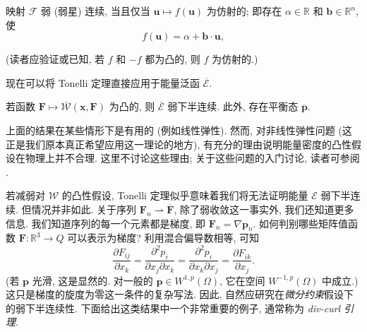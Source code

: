 \begin{Corollary}
\label{cor:tonelli-affine-integrand-weak-continuity}
映射 $\mathcal{F}$ 弱 (弱星) 连续, 当且仅当 $\bm{u}\mapsto f(\bm{u})$ 为仿射的; 即存在 $\alpha\in\mathbb{R}$ 和 $\bm{b}\in\mathbb{R}^n$, 使
\begin{equation}\label{eq:weak-continuity-integral-affine-integrand}
f(\bm{u})=\alpha+\bm{b}\cdot\bm{u},
\end{equation}

\end{Corollary}

(读者应验证或已知, 若 $f$ 和 $-f$ 都为凸的, 则 $f$ 为仿射的.)

现在可以将 Tonelli 定理直接应用于能量泛函 $\overline{\mathcal{E}}$.

\begin{Corollary}
\label{cor:convex-elasticity-energy-equilibrium-existence}
若函数 $\bm{F}\mapsto\overline{\mathcal{W}}(\bm{x},\bm{F})$ 为凸的, 则 $\overline{\mathcal{E}}$ 弱下半连续. 此外, 存在平衡态 $\overline{\bm{p}}$.
\end{Corollary}

\begingroup
\renewcommand{\endProof}{\par\nobreak\hfill$\blacksquare$\par\vspace{0.1cm}}
\endgroup

上面的结果在某些情形下是有用的 (例如线性弹性). 然而, 对非线性弹性问题 (这正是我们原本真正希望应用这一理论的地方), 有充分的理由说明能量密度的凸性假设在物理上并不合理. 这里不讨论这些理由; 关于这些问题的入门讨论, 读者可参阅 \cite{Ba}.

若减弱对 $\mathcal{W}$ 的凸性假设, Tonelli 定理似乎意味着我们将无法证明能量 $\mathcal{E}$ 弱下半连续. 但情况并非如此. 关于序列 $\bm{F}_n\rightharpoonup\overline{\bm{F}}$, 除了弱收敛这一事实外, 我们还知道更多信息. 我们知道序列的每一个元素都是梯度, 即 $\bm{F}_n=\nabla\bm{p}_n$. 如何判别哪些矩阵值函数 $\bm{F}:\mathbb{R}^3\to Q$ 可以表示为梯度? 利用混合偏导数相等, 可知
\begin{equation}\label{eq:deformation-gradient-mixed-partial-constraint}
\dfrac{\partial F_{ij}}{\partial x_k}=\dfrac{\partial^2p_i}{\partial x_j\partial x_k}=\dfrac{\partial^2p_i}{\partial x_k\partial x_j}=\dfrac{\partial F_{ik}}{\partial x_j}.
\end{equation}
(若 $\bm{p}$ 光滑, 这是显然的. 对一般的 $\bm{p}\in W^{1,p}(\Omega)$, 它在空间 $W^{-1,p}(\Omega)$ 中成立.) 这只是梯度的旋度为零这一条件的复杂写法. 因此, 自然应研究在\emph{微分约束}假设下的弱下半连续性. 下面给出这类结果中一个非常重要的例子, 通常称为 \emph{div-curl 引理}.

